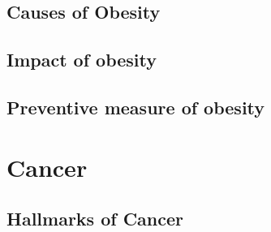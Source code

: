 \subsection{Causes of Obesity}
\label{sub:causes_of_obesity}




\citep{Malik2013}


\subsection{Impact of obesity}
\label{sub:impact_of_obesity}


\citep{Malik2013, Franks2010}




\subsection{Preventive measure of obesity}
\label{sub:preventive_measure_of_obesity}

\citep{Malik2013}




\section{Cancer}
\label{sec:cancer}


\subsection{Hallmarks of Cancer}
\label{subsec:cancerhallmarks}



